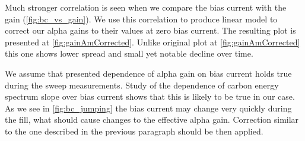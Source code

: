 \documentclass[a4paper,12pt]{article}
\begin{document}
Much stronger correlation is seen when we compare the bias current with the
gain (\cref{fig:bc_vs_gain}). We use this correlation to produce linear model
to correct our alpha gains to their values at zero bias current. The resulting
plot is presented at \cref{fig:gainAmCorrected}. Unlike original plot at
\cref{fig:gainAmCorrected} this one shows lower spread and small yet notable
decline over time.

We assume that presented dependence of alpha gain on bias current holds true
during the sweep measurements. Study of the dependence of carbon energy
spectrum slope over bias current
\cite{schmidke_alpha_vs_carbon}\cite{dkalinkin_bc_vs_carbongain} shows that
this is likely to be true in our case. As we see in \cref{fig:bc_jumping} the
bias current may change very quickly during the fill, what should cause changes
to the effective alpha gain.  Correction similar to the one described in the
previous paragraph should be then applied.
\end{document}

